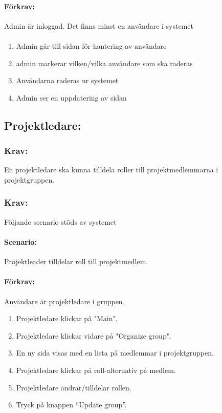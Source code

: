 \documentclass[paper=a4, fontsize=11pt,twoside]{article}
\begin{document}
	\paragraph{Förkrav:}
	Admin är inloggad. Det finns minst en användare i systemet
	\paragraph{}
	\begin{enumerate}
		\item Admin går till sidan för hantering av användare
		\item admin markerar vilken/vilka användare som ska raderas
		\item Användarna raderas ur systemet
		\item Admin ser en uppdatering av sidan
	\end{enumerate}
	
	\subsection{Projektledare:}
	
	\subsubsection*{Krav:} En projektledare ska kunna tilldela roller till projektmedlemmarna i projektgruppen.
	
	\subsubsection*{Krav:}
	Följande scenario stöds av systemet
	\paragraph{Scenario:}
	Projektleader tilldelar roll till projektmedlem.
	\paragraph{Förkrav:}
	Användare är projektledare i gruppen.
	\begin{enumerate} 
		\item Projektledare klickar på "Main".
		\item Projektledare klickar vidare på "Organize group".
		\item En ny sida visas med en lista på medlemmar i projektgruppen.
		\item Projektledare klickar på roll-alternativ på medlem.
		\item Projektledare ändrar/tilldelar rollen.
		\item Tryck på knappen “Update group”.
	\end{enumerate}
	
\end{document}
